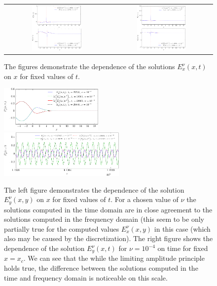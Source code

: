 \begin{figure}
\begin{tabular}{cc}
\includegraphics[width=0.5\textwidth]{res/ex_fixed_t-crop.pdf}&
\includegraphics[width=0.5\textwidth]{res/ex_fixed_t_1e3-crop.pdf}
\end{tabular}
\caption{The figures demonstrate the dependence of the solutions 
$E_x^{\nu}(x,t)$ on $x$ for fixed values of $t$. }
\label{fig:resonance_nus_ex_t}
\end{figure}
\begin{figure}
\includegraphics[width=0.45\textwidth]{res/ey_fixed_t_1e3-crop.pdf}
\includegraphics[width=0.55\textwidth]{res/ey_fixed_x_nu1e4-crop.pdf}
\caption{The left figure demonstrates the dependence of the solution  
$E_y^{\nu}(x,y)$ on $x$ for fixed values of $t$. For a chosen value of $\nu$ the solutions computed in the time domain are in close agreement 
to the solutions computed in the frequency domain (this seem to be only partially 
true for the computed values $E_x^{\nu}(x,y)$ in this case (which also may be caused by the discretization). 
The right figure shows the dependence of the solution $E_y^{\nu}(x,t)$ for $\nu=10^{-4}$ on time for fixed $x=x_c$. 
We can see that the while the limiting amplitude principle holds true, the difference between the solutions computed in 
the time and frequency domain is noticeable on this scale. 
}
\label{fig:resonance_nus_ey_t}
\end{figure}

